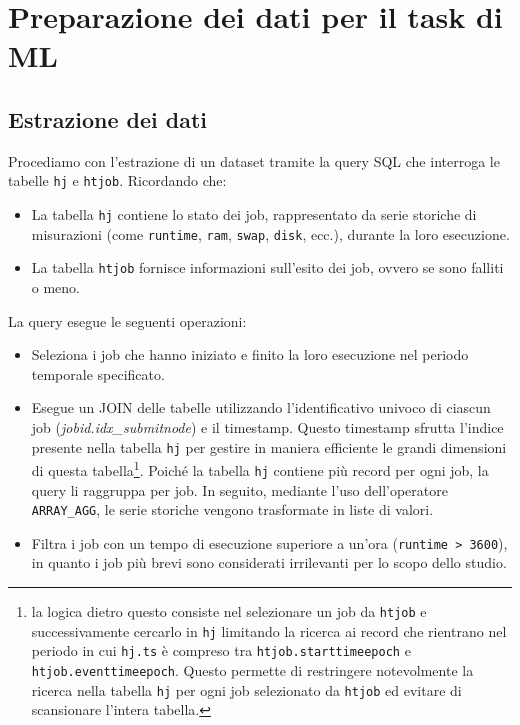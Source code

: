 \label{chap:machine_learning}
\section{Preparazione dei dati per il task di ML}

\subsection{Estrazione dei dati}

Procediamo con l'estrazione di un dataset tramite la query SQL che
interroga le tabelle \texttt{hj} e \texttt{htjob}. Ricordando che:
\begin{itemize}
    \item La tabella \texttt{hj} contiene lo stato dei job, rappresentato da
        serie storiche di misurazioni (come \texttt{runtime}, \texttt{ram},
        \texttt{swap}, \texttt{disk}, ecc.),
        durante la loro esecuzione.
    \item La tabella \texttt{htjob} fornisce informazioni sull'esito dei job,
        ovvero se sono falliti o meno.
\end{itemize}

La query esegue le seguenti operazioni:
\begin{itemize}
    \item Seleziona i job che hanno iniziato e finito la loro esecuzione nel
        periodo temporale specificato.
    \item Esegue un JOIN delle tabelle utilizzando l'identificativo univoco di
        ciascun job (\textit{jobid.idx\_submitnode}) e il timestamp. Questo
        timestamp sfrutta l'indice presente nella tabella
        \texttt{hj} per gestire in maniera efficiente le grandi dimensioni di
        questa tabella\footnote{la logica dietro questo consiste
            nel selezionare un job da \texttt{htjob} e successivamente
            cercarlo in \texttt{hj} limitando la ricerca ai record che
            rientrano nel periodo in cui \texttt{hj.ts} è compreso tra
            \texttt{htjob.starttimeepoch} e \texttt{htjob.eventtimeepoch}.
            Questo permette di restringere notevolmente la ricerca nella
            tabella \texttt{hj} per ogni job selezionato da \texttt{htjob} ed
        evitare di scansionare l'intera tabella.}. Poiché la tabella \texttt{hj} contiene più record per
        ogni job, la query li raggruppa per job. In seguito, mediante l'uso
        dell'operatore \verb|ARRAY_AGG|, le serie storiche vengono trasformate
        in liste di valori.
    \item Filtra i job con un tempo di esecuzione superiore a un'ora
        (\verb|runtime > 3600|), in quanto i job più brevi sono considerati
        irrilevanti per lo scopo dello studio.
\end{itemize}

